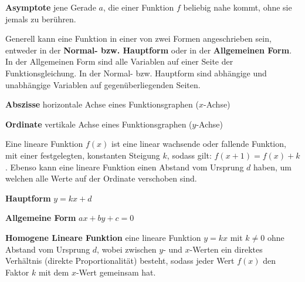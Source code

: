 \textbf{Asymptote}  jene Gerade $a$, die einer Funktion $f$ beliebig nahe kommt, ohne sie jemals zu ber\"{u}hren.

\begin{figure}[h!]
	\centering
\end{figure}

\pagebreak


Generell kann eine Funktion in einer von zwei Formen angeschrieben sein, entweder in der \textbf{Normal- bzw. Hauptform} oder in der \textbf{Allgemeinen Form}. In der Allgemeinen Form sind alle Variablen auf einer Seite der Funktionsgleichung. In der Normal- bzw. Hauptform sind abh\"{a}ngige und unabh\"{a}ngige Variablen auf gegen\"{u}berliegenden Seiten.

\textbf{Abszisse}  horizontale Achse eines Funktionsgraphen ($x$-Achse)

\textbf{Ordinate}  vertikale Achse eines Funktionsgraphen ($y$-Achse)


Eine lineare Funktion $f(x)$ ist eine linear wachsende oder fallende Funktion, mit einer festgelegten, konstanten Steigung $k$, sodass gilt: $f(x + 1) = f(x) + k$. Ebenso kann eine lineare Funktion einen Abstand vom Ursprung $d$ haben, um welchen alle Werte auf der Ordinate verschoben sind.

\textbf{Hauptform}  $y = kx + d$

\textbf{Allgemeine Form}  $ax + by + c = 0$

\textbf{Homogene Lineare Funktion}  eine lineare Funktion $y = kx$ mit $k \neq 0$ ohne Abstand vom Ursprung $d$, wobei zwischen $y$- und $x$-Werten ein direktes Verh\"{a}ltnis (direkte Proportionalit\"{a}t) besteht, sodass jeder Wert $f(x)$ den Faktor $k$ mit dem $x$-Wert gemeinsam hat.

